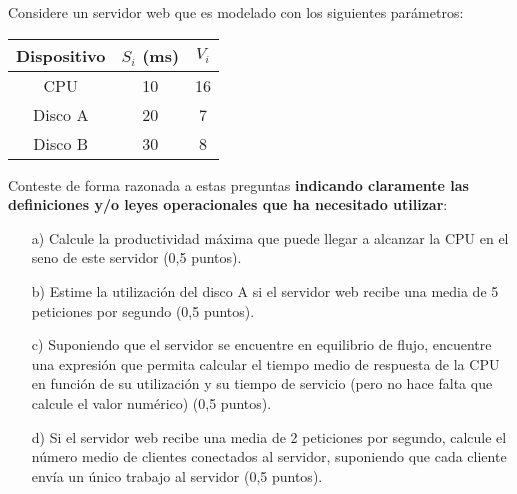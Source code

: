 \documentclass[a4paper,12pt]{article}
\begin{document}
\begin{tcolorbox}[colback=white!95!gray, colframe=black, title=3.- (2 puntos)]
Considere un servidor web que es modelado con los siguientes parámetros:

\begin{center}
\begin{tabular}{|c|c|c|}
\hline
Dispositivo & $S_i$ (ms) & $V_i$ \\
\hline
CPU & 10 & 16 \\
Disco A & 20 & 7 \\
Disco B & 30 & 8 \\
\hline
\end{tabular}
\end{center}

Conteste de forma razonada a estas preguntas \textbf{indicando claramente las definiciones y/o leyes operacionales que ha necesitado utilizar}:

\begin{enumerate}
    \item[a)] Calcule la productividad máxima que puede llegar a alcanzar la CPU en el seno de este servidor (0,5 puntos).
    \item[b)] Estime la utilización del disco A si el servidor web recibe una media de 5 peticiones por segundo (0,5 puntos).
    \item[c)] Suponiendo que el servidor se encuentre en equilibrio de flujo, encuentre una expresión que permita calcular el tiempo medio de respuesta de la CPU en función de su utilización y su tiempo de servicio (pero no hace falta que calcule el valor numérico) (0,5 puntos).
    \item[d)] Si el servidor web recibe una media de 2 peticiones por segundo, calcule el número medio de clientes conectados al servidor, suponiendo que cada cliente envía un único trabajo al servidor (0,5 puntos).
\end{enumerate}
\end{tcolorbox}
\end{document}
